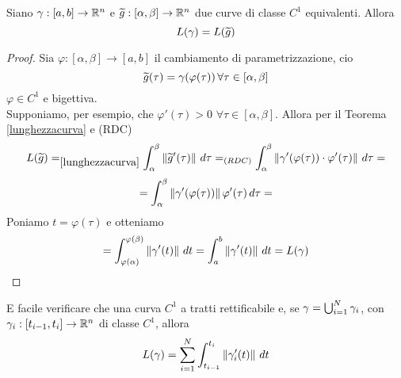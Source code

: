 \begin{theorem}
  Siano $\gamma:[a,b] \to \mathbb{R}^n$ e $\widetilde{g} : [\alpha,\beta]\to \mathbb{R}^n$ due curve di classe $C^1$
  equivalenti. Allora $$L(\gamma) = L(\widetilde{g})$$
  \begin{proof}
    Sia $\varphi:[\alpha,\beta]\to[a,b]$ il cambiamento di parametrizzazione, cio\ace 
    $$\widetilde{g} (\tau) = \gamma(\varphi(\tau)) \, \forall\tau\in[\alpha,\beta]$$
    $\varphi\in C^1$ e bigettiva. \\ 
    Supponiamo, per esempio, che $\varphi'(\tau)>0$ $\forall\tau\in[\alpha,\beta]$. Allora per 
    il Teorema \ref{lunghezzacurva} e (RDC) 
    $$L(\widetilde{g}) =_{\ref{lunghezzacurva}} \int_{\alpha}^{\beta} \left\lVert\widetilde{g}'(\tau)\right\rVert\,d\tau =_{(RDC)}
    \int_{\alpha}^{\beta} \left\lVert\gamma'(\varphi(\tau))\cdot \varphi'(\tau)\right\rVert \,d\tau = $$
    $$= \int_{\alpha}^{\beta} \left\lVert\gamma'(\varphi(\tau))\right\rVert \varphi'(\tau) \,d\tau = $$
    Poniamo $t = \varphi(\tau)$ e otteniamo
    $$= \int_{\varphi(\alpha)}^{\varphi(\beta)} \left\lVert\gamma'(t)\right\rVert\,dt = \int_{a}^{b} \left\lVert\gamma'(t)\right\rVert\,dt = L(\gamma)$$
  \end{proof}
\end{theorem}
\begin{osservazione}
  \ac{E} facile verificare che una curva $C^1$ a tratti \ace rettificabile e, se 
  $\gamma = \bigcup_{i=1}^{N} \gamma_i$, con $\gamma_i: [t_{i-1},t_i] \to \mathbb{R}^n$ di classe 
  $C^1$, allora 
  $$L(\gamma) = \sum_{i=1}^{N} \int_{t_{i-1}}^{t_i} \left\lVert\gamma_i'(t)\right\rVert \,dt$$
\end{osservazione}
